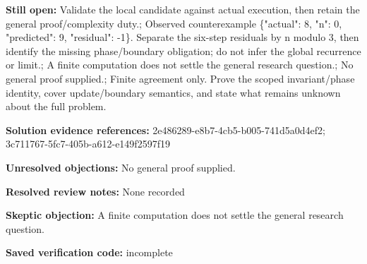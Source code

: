 \documentclass[11pt]{article}
\begin{document}
\textbf{Still open:} Validate the local candidate against actual execution, then retain the general proof/complexity duty.; Observed counterexample \{"actual": 8, "n": 0, "predicted": 9, "residual": -1\}. Separate the six-step residuals by n modulo 3, then identify the missing phase/boundary obligation; do not infer the global recurrence or limit.; A finite computation does not settle the general research question.; No general proof supplied.; Finite agreement only. Prove the scoped invariant/phase identity, cover update/boundary semantics, and state what remains unknown about the full problem.\par
\textbf{Solution evidence references:} 2e486289-e8b7-4cb5-b005-741d5a0d4ef2; 3c711767-5fc7-405b-a612-e149f2597f19\par
\textbf{Unresolved objections:} No general proof supplied.\par
\textbf{Resolved review notes:} None recorded\par
\textbf{Skeptic objection:} A finite computation does not settle the general research question.\par
\textbf{Saved verification code:} incomplete\par
\end{document}
